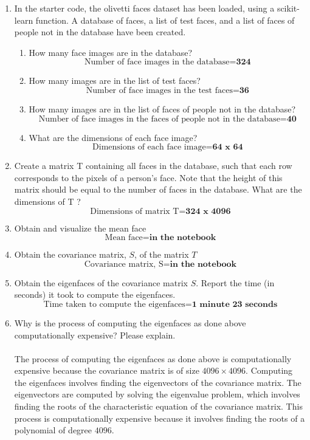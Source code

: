 \documentclass[12pt]{extarticle} %
\begin{document}
\begin{enumerate}
    \item In the starter code, the olivetti faces dataset has been loaded, using a scikit-learn function. A database
    of faces, a list of test faces, and a list of faces of people not in the database have been created.
    \begin{enumerate}
        \item How many face images are in the database? 
        \[
        \text{Number of face images in the database} = \textbf{324}
        \]
        \item How many images are in the list of test faces?
        \[
        \text{Number of face images in the test faces} = \textbf{36}
        \]
        \item How many images are in the list of faces of people not in the database?
        \[
        \text{Number of face images in the faces of people not in the database} = \textbf{40}
        \]
        \item What are the dimensions of each face image?
        \[
        \text{Dimensions of each face image} = \textbf{64 x 64}
        \]
    \end{enumerate}    
    \item Create a matrix T containing all faces in the database, such that each row corresponds to the pixels
    of a person’s face. Note that the height of this matrix should be equal to the number of faces in the
    database. What are the dimensions of T ?
    \[
    \text{Dimensions of matrix T} = \textbf{324 x 4096} 
    \]
    \item Obtain and visualize the mean face
    \[
    \text{Mean face} = \textbf{in the notebook}
    \]
    \item Obtain the covariance matrix, \(S\), of the matrix \(T\)
    \[
        \text{Covariance matrix, S} = \textbf{in the notebook}
    \]
    \item Obtain the eigenfaces of the covariance matrix \(S\). Report the time (in seconds) it took to compute the eigenfaces.
   \[
   \text{Time taken to compute the eigenfaces} = \textbf{1 minute 23 seconds}
   \]
    \item  Why is the process of computing the eigenfaces as done above computationally expensive? Please
    explain.
    \\\\ The process of computing the eigenfaces as done above is computationally expensive because the covariance matrix is of size \(4096 \times 4096\). Computing the eigenfaces involves finding the eigenvectors of the covariance matrix. The eigenvectors are computed by solving the eigenvalue problem, which involves finding the roots of the characteristic equation of the covariance matrix. This process is computationally expensive because it involves finding the roots of a polynomial of degree \(4096\).

\end{enumerate}
\end{document}
